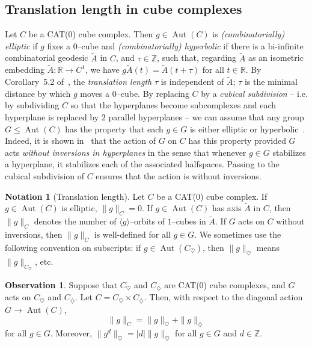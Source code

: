 \documentclass[11pt,oneside]{amsart}
\newcounter{ax}
\theoremstyle{definition}
\newtheorem{notation}[thm]{Notation}
\newtheorem*{obs}{Observation}
\DeclareMathOperator{\Aut}{Aut}
\newcommand{\field}[1]{\mathbb{#1}}
\newcommand{\integers}{\ensuremath{\field{Z}}}
\newcommand{\reals}{\ensuremath{\field{R}}}
\begin{document}
\subsection{Translation length in cube complexes}\label{subsec:cubical-translation}
Let $C$ be a CAT(0) cube complex.  Then $g\in\Aut(C)$ is \emph{(combinatorially) elliptic} if $g$ fixes a $0$--cube and \emph{(combinatorially) hyperbolic} if there is a bi-infinite combinatorial geodesic $\widetilde A$ in $C$, and 
$\tau\in\integers$, such that, regarding $\widetilde A$ as an isometric embedding $\widetilde A:\reals\to C^1$, we have $g\widetilde A(t)=\widetilde A(t+\tau)$ for all $t\in\reals$.  By Corollary~5.2 of~\cite{Haglund:semisimple}, the \emph{translation length} $\tau$ is independent of  $\widetilde A$; $\tau$ is the minimal distance by which $g$ moves a $0$--cube. By replacing $C$ by a \emph{cubical subdivision} -- i.e. by subdividing $C$ so that the hyperplanes become subcomplexes and each hyperplane is replaced by $2$ parallel hyperplanes -- we can assume that any group $G\leq\Aut(C)$ has the property that each $g\in G$ is either elliptic or hyperbolic~\cite{Haglund:semisimple}.  Indeed, it is shown in~\cite{Haglund:semisimple} that the action of $G$ on $C$ has this property provided $G$ acts \emph{without inversions in hyperplanes} in the sense that whenever $g\in G$ stabilizes a hyperplane, it stabilizes each of the associated halfspaces.  Passing to the cubical subdivision of $C$ ensures that the action is without inversions.

\begin{notation}[Translation length]\label{notation:trans_length}
Let $C$ be a CAT(0) cube complex.  If $g\in\Aut(C)$ is elliptic, $\|g\|_C=0$.  If $g\in\Aut(C)$ has axis $\tilde A$ in $C$, then $\|g\|_C$ denotes the number of $\langle g\rangle$--orbits of $1$--cubes in $\tilde A$.  If $G$ acts on $C$ without inversions, then $\|g\|_C$ is well-defined for all $g\in G$. We sometimes use the following convention on subscripts: if $g\in\Aut(C_\heartsuit)$, then $\|g\|_\heartsuit$ means $\|g\|_{C_\heartsuit}$, etc.
\end{notation}

\begin{obs}\label{obs:additive}
Suppose that $C_\heartsuit$ and $C_\diamondsuit$ are CAT(0) cube complexes, and $G$ acts on $C_\heartsuit$ and $C_\diamondsuit$.  Let $C=C_\heartsuit\times C_\diamondsuit$. Then, with respect to the diagonal action $G\to\Aut(C)$, $$\|g\|_C=\|g\|_\heartsuit+\|g\|_\diamondsuit$$ for all $g\in G$.  Moreover, $\|g^d\|_\heartsuit=|d|\|g\|_\heartsuit$ for all $g\in G$ and $d\in\integers$.
\end{obs}
\end{document}
